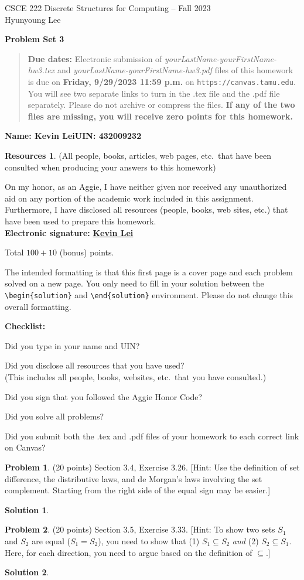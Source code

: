 \documentclass{article}
\theoremstyle{definition}
\newtheorem{problem}{Problem}
\newtheorem*{solution}{Solution}
\newtheorem*{resources}{Resources}
\newcommand{\name}[2]{\noindent\textbf{Name: #1}\hfill \textbf{UIN: #2}
  \newcommand{\myName}{#1}
  \newcommand{\myUIN}{#2}
}
\newcommand{\honor}{\noindent On my honor, as an Aggie, I have neither
  given nor received any unauthorized aid on any portion of the
  academic work included in this assignment. Furthermore, I have
  disclosed all resources (people, books, web sites, etc.) that have
  been used to prepare this homework. \\[2ex]
 \textbf{Electronic signature:} \underline{ \textbf{Kevin Lei} } } %
\newcommand{\checklist}{\noindent\textbf{Checklist:}
\begin{compactitem}[$\Box$] 
\item Did you type in your name and UIN? 
\item Did you disclose all resources that you have used? \\
(This includes all people, books, websites, etc.\ that you have consulted.)
\item Did you sign that you followed the Aggie Honor Code? 
\item Did you solve all problems? 
\item Did you submit both the .tex and .pdf files of your homework to each correct link on Canvas? 
\end{compactitem}
}
\newcommand{\problemset}[1]{\begin{center}\textbf{Problem Set #1}\end{center}}
\newcommand{\duedate}[1]{\begin{quote}\textbf{Due dates:} Electronic
    submission of \textsl{yourLastName-yourFirstName-hw3.tex} and 
    \textsl{yourLastName-yourFirstName-hw3.pdf} files of this homework is due on
    \textbf{#1} on \texttt{https://canvas.tamu.edu}. You will see two separate links
    to turn in the .tex file and the .pdf file separately. Please do not archive or compress the files.  
    \textbf{If any of the two files are missing, you will receive zero points for this homework.}\end{quote} }
\begin{document}
\begin{center}
{\large
CSCE 222 Discrete Structures for Computing -- Fall 2023\\[.5ex]
Hyunyoung Lee\\}
\end{center}
\problemset{3}
\duedate{Friday, 9/29/2023 11:59 p.m.}
\name{Kevin Lei}{432009232}  %

\begin{resources} (All people, books, articles, web pages, etc.\ that
  have been consulted when producing your answers to this homework)
\end{resources}
\honor

\bigskip

\noindent
Total $100+10$ (bonus) points.

\bigskip

\noindent
The intended formatting is that this first page is a cover page and each 
problem solved on a new page. You only need to fill in your solution between 
the \verb|\begin{solution}| and \verb|\end{solution}| environment.  
Please do not change this overall formatting.

\vfill
\checklist

\newpage
\begin{problem} (20 points) Section 3.4, Exercise 3.26.
[Hint: Use the definition of set difference, the distributive laws, and de Morgan's
laws involving the set complement. Starting from the right side of the equal sign
may be easier.]
\end{problem}
\begin{solution} 
\end{solution}

\newpage
\begin{problem} (20 points) Section 3.5, Exercise 3.33.
[Hint: To show two sets $S_1$ and $S_2$ are equal ($S_1 = S_2$), you need to 
show that (1) $S_1\subseteq S_2$ \textit{and} (2) $S_2\subseteq S_1$. Here, for each
direction, you need to argue based on the definition of $\subseteq$.] 
\end{problem}
\begin{solution} 
\end{solution}
\end{document}
